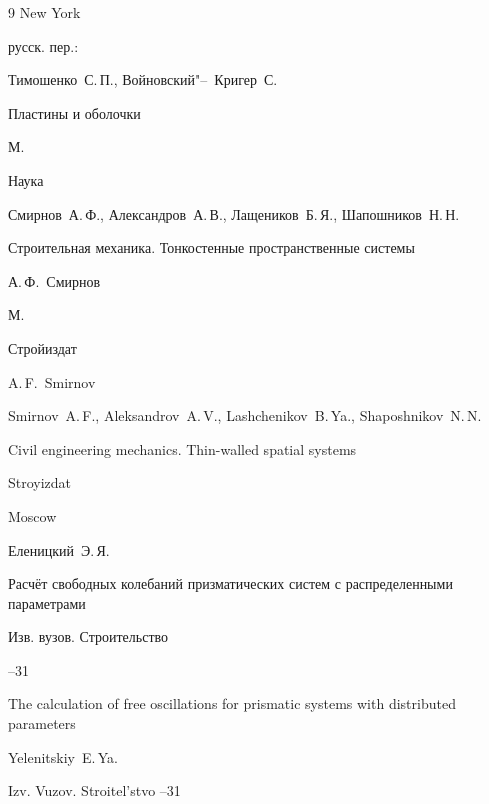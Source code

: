 \begin{thebibliography}{9}
\publaddr New York



\rtransl русск. пер.:~

\by Тимошенко~С.\,П., Войновский"--~Кригер~С.

\book Пластины и оболочки

\publaddr М.

\publ Наука








\by Смирнов~А.\,Ф., Александров~А.\,В., Лащеников~Б.\,Я., Шапошников~Н.\,Н.

\book Строительная механика. Тонкостенные пространственные системы

\ed А.\,Ф.~Смирнов

\publaddr М.

\publ Стройиздат



\misctransl

\ed A.\,F.~Smirnov

\by Smirnov~A.\,F., Aleksandrov~A.\,V., Lashchenikov~B.\,Ya., Shaposhnikov~N.\,N.

\book Civil engineering mechanics. Thin-walled spatial systems

\publ Stroyizdat

\publaddr Moscow 






\by Еленицкий~Э.\,Я.

\paper Расчёт свободных колебаний призматических систем с распределенными параметрами

\jour Изв. вузов. Строительство



--31

\misctransl

\paper The calculation of free oscillations for prismatic systems with distributed parameters

\by Yelenitskiy~E.\,Ya.

\jour Izv. Vuzov. Stroitel'stvo   --31






\end{thebibliography}
